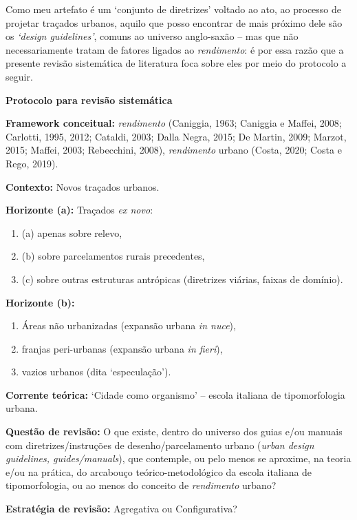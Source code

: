\documentclass[]{report}
\begin{document}
				Como meu artefato é um `conjunto de diretrizes' voltado ao ato, ao processo de projetar traçados urbanos, aquilo que posso encontrar de mais próximo dele são os \textit{`design guidelines'}, comuns ao universo anglo-saxão – mas que não necessariamente tratam de fatores ligados ao \textit{rendimento}: é por essa razão que a presente revisão sistemática de literatura foca sobre eles por meio do protocolo a seguir.

					\textbf{Protocolo para revisão sistemática}

					\textbf{Framework conceitual:} \textit{rendimento} (Caniggia, 1963; Caniggia e Maffei, 2008; Carlotti, 1995, 2012; Cataldi, 2003; Dalla Negra, 2015; De Martin, 2009; Marzot, 2015; Maffei, 2003; Rebecchini, 2008), \textit{rendimento} urbano (Costa, 2020; Costa e Rego, 2019).

					\textbf{Contexto:} Novos traçados urbanos.

					\textbf{Horizonte (a):} Traçados \textit{ex novo}: 
					\begin{enumerate}
						\item (a) apenas sobre relevo, 
						\item (b) sobre parcelamentos rurais precedentes, \item (c) sobre outras estruturas antrópicas (diretrizes viárias, faixas de domínio).
					\end{enumerate}

					\textbf{Horizonte (b):} 
					\begin{enumerate}
						\item Áreas não urbanizadas (expansão urbana \textit{in nuce}), 
						\item franjas peri-urbanas (expansão urbana \textit{in fieri}), 
						\item vazios urbanos (dita `especulação').
					\end{enumerate}

					\textbf{Corrente teórica:} `Cidade como organismo' – escola italiana de tipomorfologia urbana.

					\textbf{Questão de revisão:} O que existe, dentro do universo dos guias e/ou manuais com diretrizes/instruções de desenho/parcelamento urbano (\textit{urban design guidelines, guides/manuals}), que contemple, ou pelo menos se aproxime, na teoria e/ou na prática, do arcabouço teórico-metodológico da escola italiana de tipomorfologia, ou ao menos do conceito de \textit{rendimento} urbano?

					\textbf{Estratégia de revisão:} Agregativa ou Configurativa?
\end{document}
